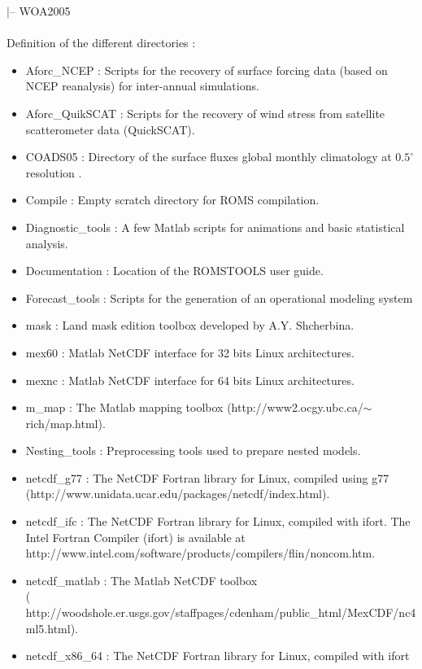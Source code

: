 $|$-- WOA2005
\\
\\
Definition of the different directories :
\begin{itemize}
\item Aforc\_NCEP : Scripts for the recovery of surface forcing data 
      (based on NCEP reanalysis) for inter-annual simulations.
\item Aforc\_QuikSCAT : Scripts for the recovery of wind stress from 
      satellite scatterometer data (QuickSCAT).
\item COADS05 : Directory of the surface fluxes global monthly 
      climatology at $0.5^\circ$ resolution \citep{Das94}.
\item Compile : Empty scratch directory for ROMS compilation.
\item Diagnostic\_tools : A few Matlab scripts for animations and
      basic statistical analysis.
\item Documentation : Location of the ROMSTOOLS user guide.
\item Forecast\_tools : Scripts for the generation of an operational
      modeling system 
\item mask : Land mask edition toolbox developed by A.Y. Shcherbina.
\item mex60 : Matlab NetCDF interface for 32 bits Linux architectures.
\item mexnc : Matlab NetCDF interface for 64 bits Linux architectures.
\item m\_map : The Matlab mapping toolbox 
      (http://www2.ocgy.ubc.ca/$\sim$rich/map.html).
\item Nesting\_tools : Preprocessing tools used to prepare nested
      models.
\item netcdf\_g77 : The NetCDF Fortran library for Linux, compiled using g77\\
      (http://www.unidata.ucar.edu/packages/netcdf/index.html).
\item netcdf\_ifc : The NetCDF Fortran library for Linux, compiled with ifort. 
      The Intel Fortran Compiler (ifort) is available at \\
      http://www.intel.com/software/products/compilers/flin/noncom.htm.
\item netcdf\_matlab : The Matlab NetCDF toolbox  \\
      ({\small
      http://woodshole.er.usgs.gov/staffpages/cdenham/public\_html/MexCDF/nc4ml5.html}).
\item netcdf\_x86\_64 : The NetCDF Fortran library for Linux, compiled with ifort

\end{itemize}
